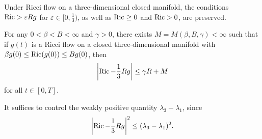\begin{corollary}
\label{topping-ch9-ricci-positive-preserved}
Under Ricci flow on a three-dimensional closed manifold, the conditions
\(\operatorname{Ric}> \varepsilon Rg\) for \(\varepsilon\in[0,\tfrac13)\), as well as
\(\operatorname{Ric}\ge 0\) and \(\operatorname{Ric}>0\), are preserved.
\end{corollary}

\begin{theorem}
\label{topping-ch9-roundness-estimate}
For any \(0<\beta<B<\infty\) and \(\gamma>0\), there exists
\(M=M(\beta,B,\gamma)<\infty\) such that if \(g(t)\) is a Ricci flow on a
closed three-dimensional manifold with
\(\beta g(0)\le \operatorname{Ric}(g(0))\le Bg(0)\), then
\[
\left|\operatorname{Ric}-\frac13 Rg\right|\le \gamma R+M
\]
for all \(t\in[0,T]\).
\end{theorem}

\begin{remark}
\label{topping-ch9-roundness-reduction}
It suffices to control the weakly positive quantity \(\lambda_3-\lambda_1\),
since
\[
\left|\operatorname{Ric}-\frac13Rg\right|^2\le (\lambda_3-\lambda_1)^2.
\]
\end{remark}

